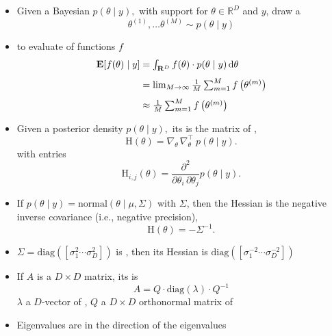 \documentclass[10pt]{report}
\newcommand{\expect}[1]{\mathbb{E}\!\left[ #1 \right]}
\newcommand{\draw}[2]{#1^{(#2)}}
\begin{document}
\begin{itemize}
\item Given a Bayesian  $p(\theta \mid y),$
  with support for  $\theta \in \mathbb{R}^D$ and  $y$,
  draw a 
  $$ \textstyle
  \draw{\theta}{1}, \ldots \draw{\theta}{M} \sim p(\theta \mid y)
  $$
\item to evaluate  of functions $f$
\begin{align*}
  \textstyle 
  \expect{f(\theta) \mid y}
  &= \textstyle \int_{\mathbb{R}^D} f(\theta) \cdot p(\theta \mid y) \,
    \textrm{d}\theta
  \\[4pt]
  &= \textstyle \lim_{M \rightarrow \infty} \frac{1}{M} \sum_{m=1}^M 
f\left( \draw{\theta}{m} \right)
  \\[4pt] \textstyle
  &\approx \textstyle \frac{1}{M} \sum_{m=1}^M f\left(\draw{\theta}{m}\right) 
\end{align*}
\end{itemize}

\begin{itemize}
\item Given a posterior density $p(\theta \mid y),$ its  is the
  matrix of ,
  $$
  \textrm{H}(\theta) = \nabla_{\!\!\theta} \, \nabla_{\!\!\theta}^\top \ p(\theta \mid y).
  $$
  with entries
  $$
  \textrm{H}_{i, j}(\theta) = \frac{\partial^2}{\partial \theta_i \, \partial
    \theta_j} p(\theta \mid y).
  $$
\item If $p(\theta \mid y) = \textrm{normal}(\theta \mid \mu, \Sigma)$ with
   $\Sigma$, then the Hessian is the
  negative inverse covariance (i.e., negative precision),
  $$
  \textrm{H}(\theta) = -\Sigma^{-1}.
  $$
\item 
  
  $\Sigma = \textrm{diag}([\sigma_1^2 \cdots \sigma_D^2])$ is
  , then its Hessian is $\textrm{diag}([\sigma_1^{-2} \cdots
  \sigma_D^{-2}])$
\end{itemize}


\begin{itemize}
\item If $A$ is a $D \times D$ matrix, its  is
  $$
  A = Q \cdot \textrm{diag}(\lambda) \cdot Q^{-1}
  $$
  $\lambda$ a $D$-vector of , $Q$ a
  $D \times D$ orthonormal matrix of 
\item Eigenvalues are  in the direction of the eigenvalues
\end{itemize}
\end{document}
